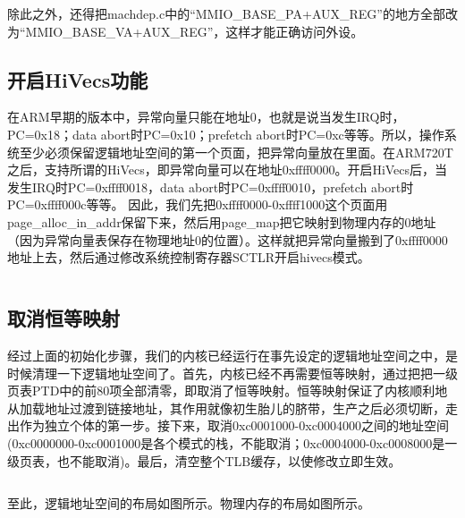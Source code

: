 \documentclass[main.tex]{subfiles}
\begin{document}
\begin{CJK*}{UTF8}{song}
\inputminted[firstline=396,lastline=401,linenos,numbersep=5pt,frame=lines,framesep=2mm]{c}{src/chapter04/kernel/machdep.c}

除此之外，还得把machdep.c中的“MMIO\_BASE\_PA+AUX\_REG”的地方全部改为“MMIO\_BASE\_VA+AUX\_REG”，这样才能正确访问外设。

\subsection{开启HiVecs功能}
在ARM早期的版本中，异常向量只能在地址0，也就是说当发生IRQ时，PC=0x18；data abort时PC=0x10；prefetch abort时PC=0xc等等。所以，操作系统至少必须保留逻辑地址空间的第一个页面，把异常向量放在里面。在ARM720T之后，支持所谓的HiVecs，即异常向量可以在地址0xffff0000。开启HiVecs后，当发生IRQ时PC=0xffff0018，data abort时PC=0xffff0010，prefetch abort时PC=0xffff000c等等。
因此，我们先把0xffff0000-0xffff1000这个页面用page\_alloc\_in\_addr保留下来，然后用page\_map把它映射到物理内存的0地址（因为异常向量表保存在物理地址0的位置）。这样就把异常向量搬到了0xffff0000地址上去，然后通过修改系统控制寄存器SCTLR开启hivecs模式。

\inputminted[firstline=403,lastline=420,linenos,numbersep=5pt,frame=lines,framesep=2mm]{c}{src/chapter04/kernel/machdep.c}

\subsection{取消恒等映射}
经过上面的初始化步骤，我们的内核已经运行在事先设定的逻辑地址空间之中，是时候清理一下逻辑地址空间了。首先，内核已经不再需要恒等映射，通过把把一级页表PTD中的前80项全部清零，即取消了恒等映射。恒等映射保证了内核顺利地从加载地址过渡到链接地址，其作用就像初生胎儿的脐带，生产之后必须切断，走出作为独立个体的第一步。接下来，取消0xc0001000-0xc0004000之间的地址空间(0xc0000000-0xc0001000是各个模式的栈，不能取消；0xc0004000-0xc0008000是一级页表，也不能取消)。最后，清空整个TLB缓存，以使修改立即生效。

\inputminted[firstline=422,lastline=431,linenos,numbersep=5pt,frame=lines,framesep=2mm]{c}{src/chapter04/kernel/machdep.c}

至此，逻辑地址空间的布局如图所示。物理内存的布局如图所示。

\clearpage
\ifxetex\else\end{CJK*}\fi
\end{document}
